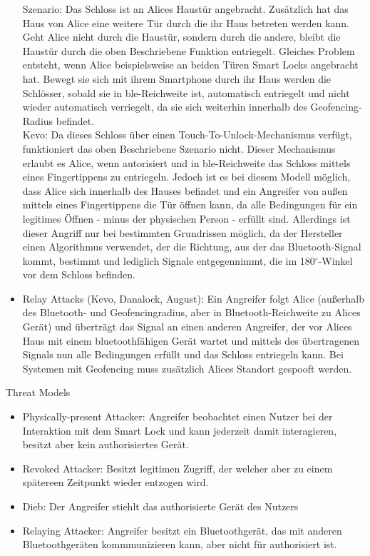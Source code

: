 \begin{itemize}
        Szenario: Das Schloss ist an Alices Haustür angebracht.
        Zusätzlich hat das Haus von Alice eine weitere Tür durch die ihr Haus betreten werden kann.
        Geht Alice nicht durch die Haustür, sondern durch die andere, bleibt die Haustür durch die oben Beschriebene Funktion entriegelt.
        Gleiches Problem entsteht, wenn Alice beispielsweise an beiden Türen Smart Locks angebracht hat.
        Bewegt sie sich mit ihrem Smartphone durch ihr Haus werden die Schlösser, sobald sie in \gls{ble}-Reichweite ist, automatisch entriegelt und nicht wieder automatisch verriegelt, da sie sich weiterhin innerhalb des Geofencing-Radius befindet.\\
        Kevo: Da dieses Schloss über einen Touch-To-Unlock-Mechanismus verfügt, funktioniert das oben Beschriebene Szenario nicht.
        Dieser Mechanismus erlaubt es Alice, wenn autorisiert und in \gls{ble}-Reichweite das Schloss mittels eines Fingertippens zu entriegeln.
        Jedoch ist es bei diesem Modell möglich, dass Alice sich innerhalb des Hauses befindet und ein Angreifer von außen mittels eines Fingertippens die Tür öffnen kann, da alle Bedingungen für ein legitimes Öffnen - minus der physischen Person - erfüllt sind.
        Allerdings ist dieser Angriff nur bei bestimmten Grundrissen möglich, da der Hersteller einen Algorithmus verwendet, der die Richtung, aus der das Bluetooth-Signal kommt, bestimmt und lediglich Signale entgegennimmt, die im 180$^{\circ}$-Winkel vor dem Schloss befinden.
        \item Relay Attacks (Kevo, Danalock, August): Ein Angreifer folgt Alice (außerhalb des Bluetooth- und Geofencingradius, aber in Bluetooth-Reichweite zu Alices Gerät) und überträgt das Signal an einen anderen Angreifer, der vor Alices Haus mit einem bluetoothfähigen Gerät wartet und mittels des übertragenen Signals nun alle Bedingungen erfüllt und das Schloss entriegeln kann.
        Bei Systemen mit Geofencing muss zusätzlich Alices Standort gespooft werden.
        
	\end{itemize}
	
	Threat Models
	\begin{itemize}
	    \item Physically-present Attacker: Angreifer beobachtet einen Nutzer bei der Interaktion mit dem Smart Lock und kann jederzeit damit interagieren, besitzt aber kein authorisiertes Gerät.
		\item Revoked Attacker: Besitzt legitimen Zugriff, der welcher aber zu einem spätereen Zeitpunkt wieder entzogen wird.
		\item Dieb: Der Angreifer stiehlt das authorisierte Gerät des Nutzers
		\item Relaying Attacker: Angreifer besitzt ein Bluetoothgerät, das mit anderen Bluetoothgeräten kommmunizieren kann, aber nicht für authorisiert ist.
	\end{itemize}
	
